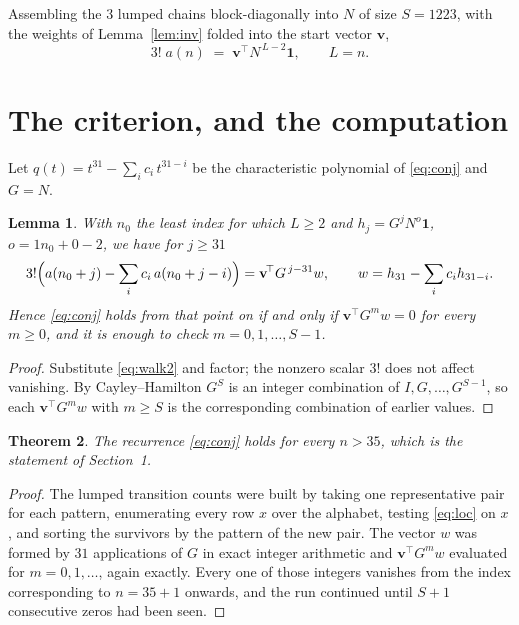 \documentclass[11pt,a4paper]{article}
\theoremstyle{plain}
\newtheorem{theorem}{Theorem}
\newtheorem{lemma}[theorem]{Lemma}
\theoremstyle{definition}
\begin{document}
Assembling the $3$ lumped chains block-diagonally into $N$ of size $S=1223$, with the
weights of Lemma~\ref{lem:inv} folded into the start vector $\mathbf{v}$,
\begin{equation}\label{eq:walk2}
3!\;a(n)\;=\;\mathbf{v}^{\!\top}N^{\,L-2}\mathbf{1},\qquad L=n .
\end{equation}

\section{The criterion, and the computation}

Let $q(t)=t^{31}-\sum_i c_i\,t^{31-i}$ be the characteristic polynomial of
\eqref{eq:conj} and $G=N$.

\begin{lemma}\label{lem:crit}
With $n_0$ the least index for which $L\ge2$ and $h_j=G^{j}N^{o}\mathbf{1}$,
$o=1n_0+0-2$, we have for $j\ge31$
\[
3!\Bigl(a(n_0+j)-\sum_i c_i\,a(n_0+j-i)\Bigr)
=\mathbf{v}^{\!\top}G^{\,j-31}w,\qquad
w=h_{31}-\sum_i c_i h_{31-i} .
\]
Hence \eqref{eq:conj} holds from that point on if and only if
$\mathbf{v}^{\!\top}G^{m}w=0$ for every $m\ge0$, and it is enough to check
$m=0,1,\dots,S-1$.
\end{lemma}

\begin{proof}
Substitute \eqref{eq:walk2} and factor; the nonzero scalar $3!$ does not affect
vanishing. By Cayley--Hamilton $G^{S}$ is an integer combination of $I,G,\dots,G^{S-1}$,
so each $\mathbf{v}^{\!\top}G^{m}w$ with $m\ge S$ is the corresponding combination of
earlier values.
\end{proof}

\begin{theorem}
The recurrence \eqref{eq:conj} holds for every $n>35$, which is the statement of
Section~1.
\end{theorem}

\begin{proof}
The lumped transition counts were built by taking one representative pair for each pattern,
enumerating every row $x$ over the alphabet, testing \eqref{eq:loc} on $x$, and sorting
the survivors by the pattern of the new pair. The vector $w$ was formed by $31$
applications of $G$ in exact integer arithmetic and $\mathbf{v}^{\!\top}G^{m}w$
evaluated for $m=0,1,\dots$, again exactly. Every one of those integers vanishes from the
index corresponding to $n=35+1$ onwards, and the run continued until $S+1$ consecutive
zeros had been seen.
\end{proof}
\end{document}
